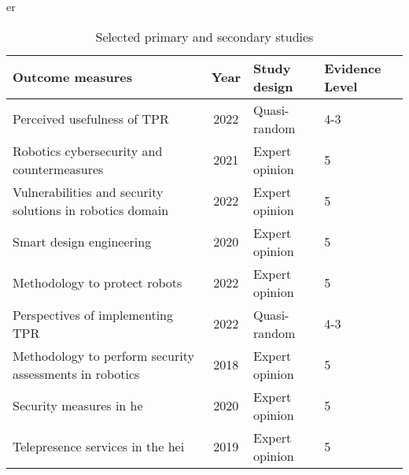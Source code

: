 \begin{table}[h!]
\centering
er
\caption{Selected primary and secondary studies}
\label{tab:studies}
\begin{tabularx}{\columnwidth}{lcll}
\toprule
\textbf{Outcome measures}                                                                       & \textbf{Year} & \textbf{Study design} & \textbf{Evidence Level} \\
\midrule
Perceived usefulness of \ac{TPR}~\cite[]{acceptance-telepresence-robots-2022}                  & 2022          & Quasi-random          & 4-3                     \\
Robotics cybersecurity and countermeasures~\cite[]{cyber_security_issues_in_robotics_2021}                                     & 2021          & Expert opinion        & 5                       \\
Vulnerabilities and security solutions in robotics domain~\cite[]{robotics_cyber_security_2022}                                  & 2022& Expert opinion& 5                       \\
Smart design engineering~\cite[]{smart_design_engineering_2020}                                 & 2020          & Expert opinion& 5                       \\
Methodology to protect robots~\cite[]{robot_security_review_2022}                               & 2022          & Expert opinion& 5                       \\
Perspectives of implementing \ac{TPR}~\cite[]{higher_edu_perception_on_tprs_2022}                                                         & 2022          & Quasi-random          & 4-3                     \\
Methodology to perform security assessments in robotics~\cite[]{robot_security_framework_2018}                                         & 2018          & Expert opinion& 5                       \\
Security measures in \ac{he}~\cite[]{role_of_cyber_security_in_higher_edu_2020}                 & 2020          & Expert opinion& 5                       \\
Telepresence services in the \ac{hei}~\cite[]{telepresence_robots_in_classroom_2019}                                                           & 2019          & Expert opinion& 5                       \\
\bottomrule
\end{tabularx}
\end{table}



